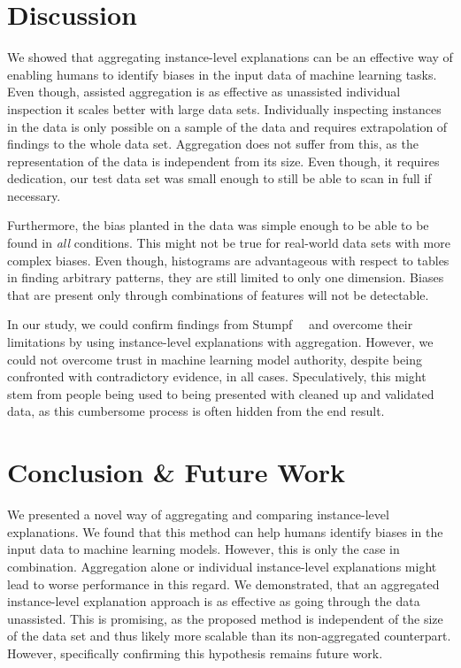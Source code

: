 \section{Discussion}
\label{sec:ag_discussion}
We showed that aggregating instance-level explanations can be an effective way of enabling humans to identify biases in the input data of machine learning tasks.
Even though, assisted aggregation is as effective as unassisted individual inspection it scales better with large data sets.
Individually inspecting instances in the data is only possible on a sample of the data and requires extrapolation of findings to the whole data set.
Aggregation does not suffer from this, as the representation of the data is independent from its size.
Even though, it requires dedication, our test data set was small enough to still be able to scan in full if necessary.

Furthermore, the bias planted in the data was simple enough to be able to be found in \emph{all} conditions.
This might not be true for real-world data sets with more complex biases.
Even though, histograms are advantageous with respect to tables in finding arbitrary patterns, they are still limited to only one dimension.
Biases that are present only through combinations of features will not be detectable.

In our study, we could confirm findings from Stumpf~\etal~\cite{harmful} and overcome their limitations by using instance-level explanations with aggregation.
However, we could not overcome trust in machine learning model authority, despite being confronted with contradictory evidence, in all cases.
Speculatively, this might stem from people being used to being presented with cleaned up and validated data, as this cumbersome process is often hidden from the end result.


\section{Conclusion \& Future Work}
\label{sec:conclusion}
We presented a novel way of aggregating and comparing instance-level explanations.
We found that this method can help humans identify biases in the input data to machine learning models.
However, this is only the case in combination.
Aggregation alone or individual instance-level explanations might lead to worse performance in this regard.
We demonstrated, that an aggregated instance-level explanation approach is as effective as going through the data unassisted.
This is promising, as the proposed method is independent of the size of the data set and thus likely more scalable than its non-aggregated counterpart.
However, specifically confirming this hypothesis remains future work.

